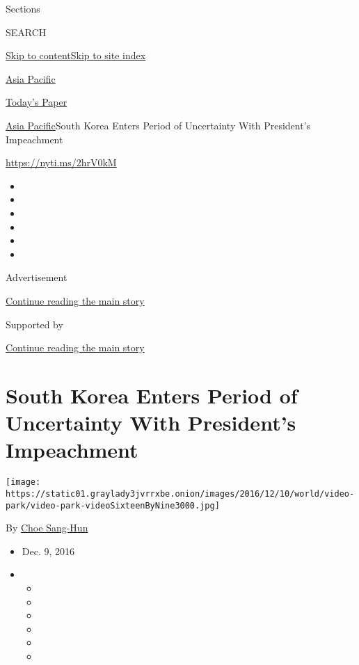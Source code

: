Sections

SEARCH

\protect\hyperlink{site-content}{Skip to
content}\protect\hyperlink{site-index}{Skip to site index}

\href{https://www.nytimes3xbfgragh.onion/section/world/asia}{Asia
Pacific}

\href{https://myaccount.nytimes3xbfgragh.onion/auth/login?response_type=cookie\&client_id=vi}{}

\href{https://www.nytimes3xbfgragh.onion/section/todayspaper}{Today's
Paper}

\href{/section/world/asia}{Asia Pacific}\textbar{}South Korea Enters
Period of Uncertainty With President's Impeachment

\url{https://nyti.ms/2hrV0kM}

\begin{itemize}
\item
\item
\item
\item
\item
\item
\end{itemize}

Advertisement

\protect\hyperlink{after-top}{Continue reading the main story}

Supported by

\protect\hyperlink{after-sponsor}{Continue reading the main story}

\hypertarget{south-korea-enters-period-of-uncertainty-with-presidents-impeachment}{%
\section{South Korea Enters Period of Uncertainty With President's
Impeachment}\label{south-korea-enters-period-of-uncertainty-with-presidents-impeachment}}

\texttt{[image: https://static01.graylady3jvrrxbe.onion/images/2016/12/10/world/video-park/video-park-videoSixteenByNine3000.jpg]}

By \href{http://www.nytimes3xbfgragh.onion/by/choe-sang-hun}{Choe
Sang-Hun}

\begin{itemize}
\item
  Dec. 9, 2016
\item
  \begin{itemize}
  \item
  \item
  \item
  \item
  \item
  \item
  \end{itemize}
\end{itemize}


